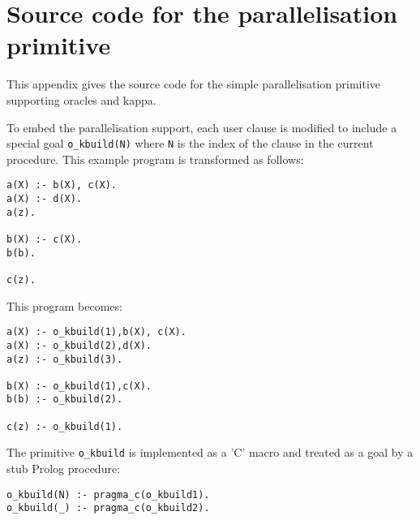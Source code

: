 \chapter[Source code for \texttt{kappa}]{Source code for the parallelisation primitive}
\label{kappa_macro}

This appendix gives the source code for the simple parallelisation primitive
supporting oracles and kappa.

To embed the parallelisation support, each user clause is modified to include
a special goal \texttt{o\_{}kbuild(N)} where \texttt{N} is the index of the clause in
the current procedure.  This example program is transformed as
follows:
\begin{verbatim}
a(X) :- b(X), c(X).
a(X) :- d(X).
a(z).

b(X) :- c(X).
b(b).

c(z).
\end{verbatim}
This program becomes:
\begin{verbatim}
a(X) :- o_kbuild(1),b(X), c(X).
a(X) :- o_kbuild(2),d(X).
a(z) :- o_kbuild(3).

b(X) :- o_kbuild(1),c(X).
b(b) :- o_kbuild(2).

c(z) :- o_kbuild(1).
\end{verbatim}

The primitive \texttt{o\_{}kbuild} is implemented as a 'C' macro and treated as
a goal by a stub Prolog procedure:
\begin{verbatim}
o_kbuild(N) :- pragma_c(o_kbuild1).
o_kbuild(_) :- pragma_c(o_kbuild2).
\end{verbatim}

